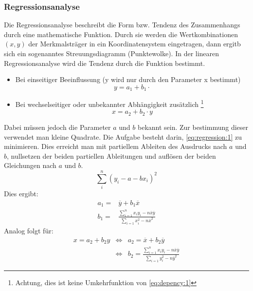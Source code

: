 \subsubsection{Regressionsanalyse}\label{theorie:regression}
Die Regressionsanalyse beschreibt die Form bzw. Tendenz des Zusammenhangs durch eine mathematische Funktion. Durch sie werden die Wertkombinationen $(x,y)$ der Merkmalsträger in ein Koordinatensystem eingetragen, dann ergitb sich ein sogenanntes Streuungsdiagramm (Punktewolke). In der linearen Regressionsanalyse wird die Tendenz durch die Funktion bestimmt.\\
\begin{itemize}
\item Bei einseitiger Beeinflussung (y wird nur durch den Parameter x bestimmt)
\begin{equation}
y=a_1+b_1\cdot \label{eq:depency:1}
\end{equation}
\item Bei wechselseitiger oder unbekannter Abhängigkeit zusätzlich \footnote{Achtung, dies ist keine Umkehrfunktion von \autoref{eq:depency:1}}
\begin{equation}
x=a_2+b_2\cdot y
\end{equation}
\end{itemize}
Dabei müssen jedoch die Parameter $a$ und $b$ bekannt sein. Zur bestimmung dieser verwendet man kleine Quadrate. Die Aufgabe besteht darin, \autoref{eq:regression:1} zu minimieren. Dies erreicht man mit partiellem Ableiten des Ausdrucks nach $a$ und $b$, nullsetzen der beiden partiellen Ableitungen und auflösen der beiden Gleichungen nach $a$ und $b$. 
\begin{equation}\label{eq:regression:1}
\sum_i^n \left(y_i - a - bx_i\right)^2
\end{equation}
Dies ergibt:
\begin{align}
a_1 =& \overline{y} + b_1\overline{x} \label{eq:regression:4-1}\\
b_1 =& \frac{\sum_{i=1}^n x_i y_i - n\overline{x}\overline{y}}{\sum_{i=1}x_i^2-n\overline{x}^2} \label{eq:regression:4-2}
\end{align}
Analog folgt für:
\begin{align}
x=a_2+b_2y &\Longleftrightarrow& a_2=\overline{x}+b_2\overline{y}\\
&\Longleftrightarrow& b_2 = \frac{\sum_{i=1}^n x_i y_i - n\overline{x}\overline{y}}{\sum_{i=1}y_i^2-n\overline{y}^2}
\end{align}
